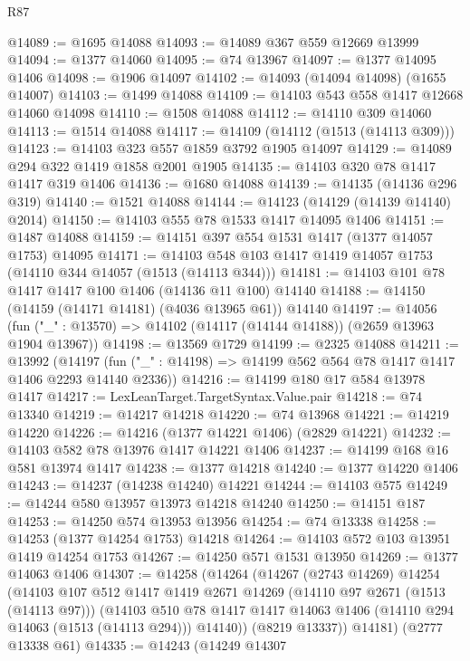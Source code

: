 \begin{lexlean}{R87}
\begin{coremodule}
{{@14089 := @1695 @14088
@14093 := @14089 @367 @559 @12669 @13999
@14094 := @1377 @14060
@14095 := @74 @13967
@14097 := @1377 @14095 @1406
@14098 := @1906 @14097
@14102 := @14093 (@14094 @14098) (@1655 @14007)
@14103 := @1499 @14088
@14109 := @14103 @543 @558 @1417 @12668 @14060 @14098
@14110 := @1508 @14088
@14112 := @14110 @309 @14060
@14113 := @1514 @14088
@14117 := @14109 (@14112 (@1513 (@14113 @309)))
@14123 := @14103 @323 @557 @1859 @3792 @1905 @14097
@14129 := @14089 @294 @322 @1419 @1858 @2001 @1905
@14135 := @14103 @320 @78 @1417 @1417 @319 @1406
@14136 := @1680 @14088
@14139 := @14135 (@14136 @296 @319)
@14140 := @1521 @14088
@14144 := @14123 (@14129 (@14139 @14140) @2014)
@14150 := @14103 @555 @78 @1533 @1417 @14095 @1406
@14151 := @1487 @14088
@14159 := @14151 @397 @554 @1531 @1417 (@1377 @14057 @1753) @14095
@14171 := @14103 @548 @103 @1417 @1419 @14057 @1753 (@14110 @344 @14057 (@1513 (@14113 @344)))
@14181 := @14103 @101 @78 @1417 @1417 @100 @1406 (@14136 @11 @100) @14140
@14188 := @14150 (@14159 (@14171 @14181) (@4036 @13965 @61)) @14140
@14197 := @14056 (fun ("_" : @13570) => @14102 (@14117 (@14144 @14188)) (@2659 @13963 @1904 @13967))
@14198 := @13569 @1729
@14199 := @2325 @14088
@14211 := @13992
    (@14197 (fun ("_" : @14198) => @14199 @562 @564 @78 @1417 @1417 @1406 @2293 @14140 @2336))
@14216 := @14199 @180 @17 @584 @13978 @1417
@14217 := LexLeanTarget.TargetSyntax.Value.pair
@14218 := @74 @13340
@14219 := @14217 @14218
@14220 := @74 @13968
@14221 := @14219 @14220
@14226 := @14216 (@1377 @14221 @1406) (@2829 @14221)
@14232 := @14103 @582 @78 @13976 @1417 @14221 @1406
@14237 := @14199 @168 @16 @581 @13974 @1417
@14238 := @1377 @14218
@14240 := @1377 @14220 @1406
@14243 := @14237 (@14238 @14240) @14221
@14244 := @14103 @575
@14249 := @14244 @580 @13957 @13973 @14218 @14240
@14250 := @14151 @187
@14253 := @14250 @574 @13953 @13956
@14254 := @74 @13338
@14258 := @14253 (@1377 @14254 @1753) @14218
@14264 := @14103 @572 @103 @13951 @1419 @14254 @1753
@14267 := @14250 @571 @1531 @13950
@14269 := @1377 @14063 @1406
@14307 := @14258
    (@14264
      (@14267
        (@2743 @14269)
        @14254
        (@14103
          @107
          @512
          @1417
          @1419
          @2671
          @14269
          (@14110 @97 @2671 (@1513 (@14113 @97)))
          (@14103
            @510
            @78
            @1417
            @1417
            @14063
            @1406
            (@14110 @294 @14063 (@1513 (@14113 @294)))
            @14140))
        (@8219 @13337))
      @14181)
    (@2777 @13338 @61)
@14335 := @14243
    (@14249
      @14307
}}
\end{coremodule}
\end{lexlean}
